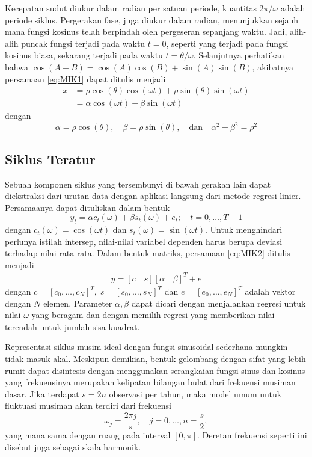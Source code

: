 \begin{spacing}{1.5}
	Kecepatan sudut diukur dalam radian per satuan periode, kuantitas $2\pi / \omega$ adalah periode siklus. Pergerakan fase, juga diukur dalam radian, menunjukkan sejauh mana fungsi kosinus telah berpindah oleh pergeseran sepanjang waktu. Jadi, alih-alih puncak fungsi terjadi pada waktu $t = 0$, seperti yang terjadi pada fungsi kosinus biasa, sekarang terjadi pada
	waktu $t = \theta/\omega$. Selanjutnya perhatikan bahwa $\cos(A-B) = \cos(A)\cos(B)+\sin(A)\sin(B)$, akibatnya persamaan \ref{eq:MIK1} dapat ditulis menjadi
	\begin{equation}
		\begin{aligned}
			x &= \rho \cos(\theta)\cos(\omega t) + \rho \sin(\theta)\sin(\omega t) \\
			&= \alpha\cos(\omega t) + \beta\sin(\omega t)
		\end{aligned}
	\end{equation}
	dengan 
	\begin{equation*}
		\alpha = \rho \cos(\theta), \quad 
		\beta = \rho \sin(\theta), \quad \text{dan} \quad
		\alpha^2 + \beta^2 = \rho^2
	\end{equation*}
\subsection[Siklus Teratur]{Siklus Teratur}
	Sebuah komponen siklus yang tersembunyi di bawah gerakan lain dapat diekstraksi dari urutan data dengan aplikasi langsung dari metode regresi linier. Persamaanya dapat dituliskan dalam bentuk
	\begin{equation}\label{eq:MIK2}
		y_t = \alpha c_t(\omega) + \beta s_t(\omega) + e_t; \quad t = 0, \dots, T-1
	\end{equation}
	dengan $c_t(\omega)=\cos(\omega t)$ dan $s_t(\omega)=\sin(\omega t)$. Untuk menghindari perlunya istilah intersep, nilai-nilai variabel dependen harus berupa deviasi terhadap nilai rata-rata. Dalam bentuk matriks, persamaan \ref{eq:MIK2} ditulis menjadi
	\begin{eqnarray}
		y = [c \quad s][\alpha \quad \beta]^T + e
	\end{eqnarray} 
	dengan $c = [c_0,\dots,c_N]^T, \; s = [s_0, \dots, s_N]^T$ dan $e = [e_0,\dots,e_N]^T$ adalah vektor dengan $N$ elemen. Parameter $\alpha, \beta$ dapat dicari dengan menjalankan regresi untuk nilai $\omega$ yang beragam dan  dengan memilih regresi yang memberikan nilai terendah untuk jumlah sisa kuadrat.
	
	Representasi siklus musim ideal dengan fungsi sinusoidal sederhana mungkin tidak masuk akal. Meskipun demikian, bentuk gelombang dengan sifat yang lebih rumit dapat disintesis dengan menggunakan serangkaian fungsi sinus dan kosinus yang frekuensinya merupakan kelipatan bilangan bulat dari frekuensi musiman dasar. Jika terdapat $s = 2n$ observasi per tahun, maka model umum untuk fluktuasi musiman akan terdiri dari frekuensi
	\begin{equation}
		\omega_j = \frac{2\pi j}{s}, \quad j = 0, \dots, n = \frac{s}{2},
	\end{equation}
	yang mana sama dengan ruang pada interval $[0, \pi]$. Deretan frekuensi seperti ini disebut juga sebagai skala harmonik.
	

\end{spacing}
